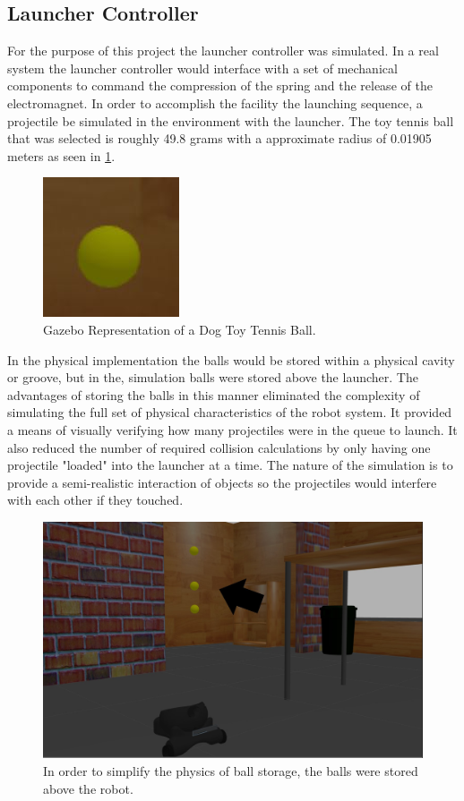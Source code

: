 \documentclass[11pt]{article}
\begin{document}
\subsection{Launcher Controller}
For the purpose of this project the launcher controller was simulated.  In a real system the launcher controller would interface with a set of mechanical components to command the compression of the spring and the release of the electromagnet.  In order to accomplish the facility the launching sequence, a projectile be simulated in the environment with the launcher. The toy tennis ball that was selected is roughly 49.8 grams with a approximate radius of 0.01905 meters as seen in \ref{Dog Toy}.
\begin{figure}[H]
    \centering
        \includegraphics[scale=.4, angle =0]{figures/ball.JPG}
    \caption{Gazebo Representation of a Dog Toy Tennis Ball.}
    \label{Dog Toy}
\end{figure}
In the physical implementation the balls would be stored within a physical cavity or groove, but in the, simulation balls were stored above the launcher. The advantages of storing the balls in this manner eliminated the complexity of simulating the full set of physical characteristics of the robot system. It provided a means of visually verifying how many projectiles were in the queue to launch. It also reduced the number of required collision calculations by only having one projectile "loaded" into the launcher at a time.  The nature of the simulation is to provide a semi-realistic interaction of objects so the projectiles would interfere with each other if they touched.  
\begin{figure}[H]
    \centering
        \includegraphics[scale=.2, angle =0]{figures/ball_storage.JPG}
    \caption{In order to simplify the physics of ball storage, the balls were stored above the robot.}
    \label{Simulated Ball Storage}
\end{figure}
\end{document}
